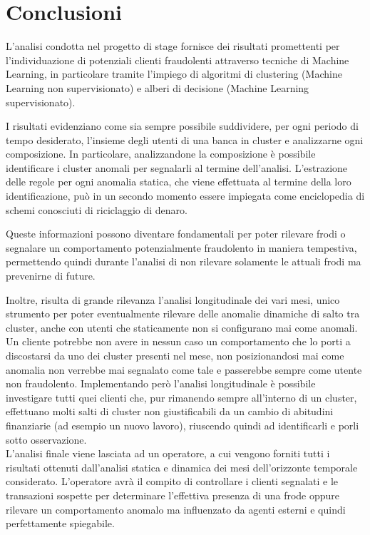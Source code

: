 \chapter{Conclusioni}
L'analisi condotta nel progetto di stage fornisce dei risultati promettenti per l'individuazione di potenziali clienti fraudolenti attraverso tecniche di Machine Learning, in particolare tramite l'impiego di algoritmi di clustering (Machine Learning non supervisionato) e alberi di decisione (Machine Learning supervisionato). 

I risultati evidenziano come sia sempre possibile suddividere, per ogni periodo di tempo desiderato, l'insieme degli utenti di una banca in cluster e analizzarne ogni composizione. In particolare, analizzandone la composizione è possibile identificare i cluster anomali per segnalarli al termine dell'analisi.
L'estrazione delle regole per ogni anomalia statica, che viene effettuata al termine della loro identificazione, può in un secondo momento essere impiegata come enciclopedia di schemi conosciuti di riciclaggio di denaro.

Queste informazioni possono diventare fondamentali per poter rilevare frodi o segnalare un comportamento potenzialmente fraudolento  in maniera tempestiva, permettendo quindi durante l'analisi di non rilevare solamente le attuali frodi ma prevenirne di future.


Inoltre, risulta di grande rilevanza l'analisi longitudinale dei vari mesi, unico strumento per poter eventualmente rilevare delle anomalie dinamiche di salto tra cluster, anche con utenti che staticamente non si configurano mai come anomali. Un cliente potrebbe non avere in nessun caso un comportamento che lo porti a discostarsi da uno dei cluster presenti nel mese, non posizionandosi mai come anomalia non verrebbe mai segnalato come tale e passerebbe sempre come utente non fraudolento. Implementando però l'analisi longitudinale è possibile investigare tutti quei clienti che, pur rimanendo sempre all'interno di un cluster, effettuano molti salti di cluster non giustificabili da un cambio di abitudini finanziarie (ad esempio un nuovo lavoro), riuscendo quindi ad identificarli e porli sotto osservazione. \\

\noindent L'analisi finale viene lasciata ad un operatore, a cui vengono forniti tutti i risultati ottenuti dall'analisi statica e dinamica dei mesi dell'orizzonte temporale considerato. L'operatore avrà il compito di controllare i clienti segnalati e le transazioni sospette per determinare l'effettiva presenza di una frode oppure rilevare un comportamento anomalo ma influenzato da agenti esterni e quindi perfettamente spiegabile.\\



